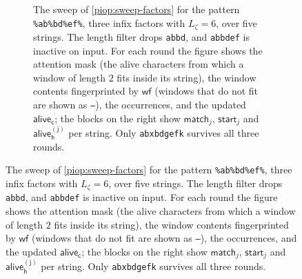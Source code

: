 \begin{figure}[p]
\begin{figure}[p]
{}
\caption{The sweep of \cref{piop:sweep-factors} for the pattern \texttt{\%ab\%bd\%ef\%}, three infix factors with $L_\zeta=6$, over five strings. The length filter drops \texttt{abbd}, and \texttt{abbdef} is inactive on input. For each round the figure shows the attention mask (the alive characters from which a window of length $2$ fits inside its string), the window contents fingerprinted by $\mathsf{wf}$ (windows that do not fit are shown as \texttt{--}), the occurrences, and the updated $\mathsf{alive_c}$; the blocks on the right show $\mathsf{match}_j$, $\mathsf{start}_j$ and $\mathsf{alive_h^{(j)}}$ per string. Only \texttt{abxbdgefk} survives all three rounds.}
\label{fig:sweep-example}
\ifsp\end{figure}\else\end{figure}\fi

